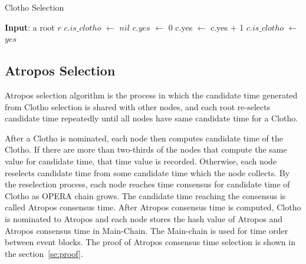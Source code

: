 \documentclass[preprint,12pt]{elsarticle}
\begin{document}
\begin{algorithm}
\caption{Clotho Selection}\label{al:acs}
\begin{algorithmic}[1]
    \State \textbf{Input}: a root $r$
        \State$c.is\_clotho$ $\leftarrow$ $nil$ 
        \State$c.yes$ $\leftarrow$ 0
                \State c.yes $\leftarrow$ c.yes + 1
            \EndIf
        \EndFor
            \State $c.is\_clotho$ $\leftarrow$ $yes$
        \EndIf
    \EndFor
\EndProcedure
\end{algorithmic}
\end{algorithm}


\subsection{Atropos Selection}
Atropos selection algorithm is the process in which the candidate time generated from Clotho selection is shared with other nodes, and each root re-selects candidate time repeatedly until all nodes have same candidate time for a Clotho. 

After a Clotho is nominated, each node then computes candidate time of the Clotho. If there are more than two-thirds of the nodes that compute the same value for candidate time, that time value is recorded. Otherwise, each node reselects candidate time from some candidate time which the node collects. By the reselection process, each node reaches time consensus for candidate time of Clotho as OPERA chain grows. The candidate time reaching the consensus is called Atropos consensus time. After Atropos consensus time is computed,  Clotho is nominated to Atropos and each node stores the hash value of Atropos and Atropos consensus time in Main-Chain. The Main-chain is used for time order between event blocks. The proof of Atropos consensus time selection is shown in the section~\ref{se:proof}. 
\end{document}
